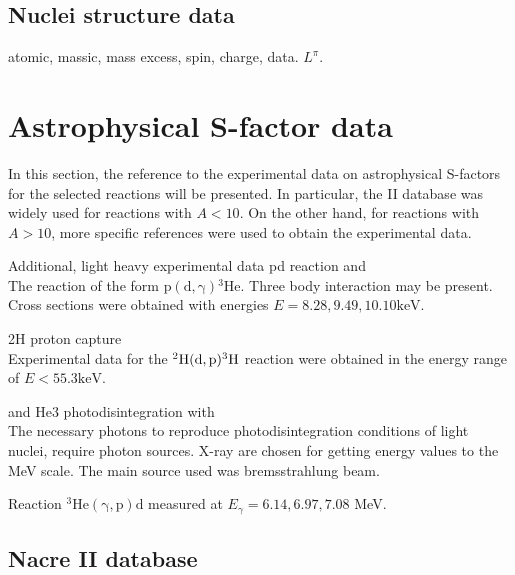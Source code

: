 \documentclass[openany]{book}
\begin{document}
\subsection{Nuclei structure data} \label{sub:nucleiStructureData}

atomic, massic, mass excess, spin, charge, data. $L^{\pi}$.

\section{Astrophysical S-factor data} \label{sec:sfactorData}

In this section, the reference to the experimental data on astrophysical S-factors for the selected reactions will be presented. In particular, the  II database was widely used for reactions with $A < 10$. On the other hand, for reactions with $A > 10$, more specific references were used to obtain the experimental data.

Additional, light heavy experimental data pd reaction \cite{bystritsky_gerasimov_krylov_parzhitskii_dudkin_kaminskii_nechaev_padalko_petrov_mesyats_et_2008} and\\

The reaction of the form $\mathrm{p(d,\gamma){}^{3}He}$. Three body interaction may be present. Cross sections were obtained with energies $E = 8.28, 9.49, 10.10 \mathrm{keV}$. 

 2H proton capture \cite{schmid_chasteler_laymon_weller_prior_tilley_1995} \\

Experimental data for the $\mathrm{{}^{2}H(d, p){}^{3}H}$ reaction were obtained in the energy range of $E < 55.3\mathrm{keV}$.

 and He3 photodisintegration \cite{berman_koester_smith_1964} with  \\

The necessary photons to reproduce photodisintegration conditions of light nuclei, require photon sources. X-ray are chosen for getting energy values to the MeV scale. The main source used was bremsstrahlung beam. 

 \cite{warren_erdman_robertson_axen_macdonald_1963}

Reaction $\mathrm{{}^{3}He(\gamma, p)d}$ measured at $E_\gamma = 6.14, 6.97, 7.08$ MeV.

\subsection{Nacre II database} \label{sub:nacreII}
\end{document}
